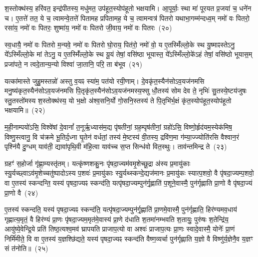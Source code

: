 श॒स्तोक्थ॑स्य॒ हरि॑वत॒ इन्द्र॑पीतस्य॒ मधु॑मत॒ उप॑हूत॒स्योप॑हूतो भक्षयामि। आ॒पूर्याः॒ स्था मा॑ पूरयत प्र॒जया॑ च॒ धने॑न च। ए॒तत्ते॑ तत॒ ये च॒ त्वामन्वे॒तत्ते॑ पितामह प्रपितामह॒ ये च॒ त्वामन्वत्र॑ पितरो यथाभा॒गम्म॑न्दध्व॒म् नमो॑ वः पितरो॒ रसा॑य॒ नमो॑ वः पितरः॒ शुष्मा॑य॒ नमो॑ वः पितरो जी॒वाय॒ नमो॑ वः पितरः~(२०)

स्व॒धायै॒ नमो॑ वः पितरो म॒न्यवे॒ नमो॑ वः पितरो घो॒राय॒ पित॑रो॒ नमो॑ वो॒ य ए॒तस्मिँ॑ल्लो॒के स्थ यु॒ष्माꣴस्ते\-ऽनु॒ ये᳚\-ऽस्मिँल्लो॒के मां ते\-ऽनु॒ य ए॒तस्मिँ॑ल्लो॒के स्थ यू॒यं तेषां॒ वसि॑ष्ठा भूयास्त॒ ये᳚\-ऽस्मिँल्लो॒के॑\-ऽहं तेषां॒ वसि॑ष्ठो भूयास॒म् प्रजा॑पते॒ न त्वदे॒तान्य॒न्यो विश्वा॑ जा॒तानि॒ परि॒ ता ब॑भूव~(२१)

यत्का॑मास्ते जुहु॒मस्तन्नो॑ अस्तु व॒यꣴ स्या॑म॒ पत॑यो रयी॒णाम्। दे॒वकृ॑त॒स्यैन॑सो\-ऽव॒यज॑नमसि मनु॒ष्य॑कृत॒स्यैन॑सो\-ऽ\-व॒यज॑नमसि पि॒तृकृ॑त॒स्यैन॑सो\-ऽव॒यज॑नमस्य॒फ्सु धौ॒तस्य॑ सोम देव ते॒ नृभिः॑ सु॒तस्ये॒ष्टय॑जुषः स्तु॒तस्तो॑मस्य श॒स्तोक्थ॑स्य॒ यो भ॒क्षो अ॑श्व॒सनि॒र्यो गो॒सनि॒स्तस्य॑ ते पि॒तृभि॑र्भ॒क्षं कृ॑त॒स्योप॑हूत॒स्योप॑हूतो भक्षयामि॥~(२२)

{}%

म॒ही॒नाम्पयो॑\-ऽसि॒ विश्वे॑षां दे॒वानां᳚ त॒नूर्\mbox{}ऋ॒ध्यास॑म॒द्य पृ॑षतीनां॒ ग्रह॒म्पृष॑तीनां॒ ग्रहो॑\-ऽसि॒ विष्णो॒र्\mbox{}हृद॑यम॒स्येक॑मिष॒ विष्णु॒स्त्वानु॒ वि च॑क्रमे भू॒तिर्द॒ध्ना घृ॒तेन॑ वर्धतां॒ तस्य॑ मे॒ष्टस्य॑ वी॒तस्य॒ द्रवि॑ण॒मा ग॑म्या॒ज्ज्योति॑रसि वैश्वान॒रं पृश्नि॑यै दु॒ग्धम् याव॑ती॒ द्यावा॑पृथि॒वी म॑हि॒त्वा याव॑च्च स॒प्त सिन्ध॑वो वित॒स्थुः। ताव॑न्तमिन्द्र ते~(२३)

ग्रहꣳ॑ स॒होर्जा गृ॑ह्णा॒म्यस्तृ॑तम्। यत्कृ॑ष्णशकु॒नः पृ॑षदा॒ज्यम॑वमृ॒शेच्छू॒द्रा अ॑स्य प्र॒मायु॑काः स्यु॒र्यच्छ्वा\-ऽव॑मृ॒शेच्चतु॑ष्पादो\-ऽस्य प॒शवः॑ प्र॒मायु॑काः स्यु॒र्यथ्स्कन्दे॒द्यज॑मानः प्र॒मायु॑कः स्यात्प॒शवो॒ वै पृ॑षदा॒ज्यम्प॒शवो॒ वा ए॒तस्य॑ स्कन्दन्ति॒ यस्य॑ पृषदा॒ज्यꣴ स्कन्द॑ति॒ यत्पृ॑षदा॒ज्यम्पुन॑र्गृ॒ह्णाति॑ प॒शूने॒वास्मै॒ पुन॑र्गृह्णाति प्रा॒णो वै पृ॑षदा॒ज्यं प्रा॒णो वै~(२४)

ए॒तस्य॑ स्कन्दति॒ यस्य॑ पृषदा॒ज्यꣴ स्कन्द॑ति॒ यत्पृ॑षदा॒ज्यम्पुन॑र्गृ॒ह्णाति॑ प्रा॒णमे॒वास्मै॒ पुन॑र्गृह्णाति॒ हिर॑ण्यमव॒धाय॑ गृह्णात्य॒मृतं॒ वै हिर॑ण्यं प्रा॒णः पृ॑षदा॒ज्यम॒मृत॑मे॒वास्य॑ प्रा॒णे द॑धाति श॒तमा॑नम्भवति श॒तायुः॒ पुरु॑षः श॒तेन्द्रि॑य॒ आयु॑ष्ये॒वेन्द्रि॒ये प्रति॑ तिष्ठ॒त्यश्व॒मव॑ घ्रापयति प्राजाप॒त्यो वा अश्वः॑ प्राजाप॒त्यः प्रा॒णः स्वादे॒वास्मै॒ योनेः᳚ प्रा॒णं निर्मि॑मीते॒ वि वा ए॒तस्य॑ य॒ज्ञश्छि॑द्यते॒ यस्य॑ पृषदा॒ज्यꣴ स्कन्द॑ति वैष्ण॒व्यर्चा पुन॑र्गृह्णाति य॒ज्ञो वै विष्णु॑र्य॒ज्ञेनै॒व य॒ज्ञꣳ सं त॑नोति॥~(२५)

